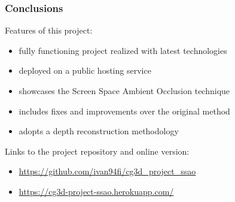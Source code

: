 \documentclass{beamer}
\begin{document}
\begin{frame}
\frametitle{Conclusions}
Features of this project:
\begin{itemize}
    \item fully functioning project realized with latest technologies
    \item deployed on a public hosting service
    \item showcases the Screen Space Ambient Occlusion technique
    \item includes fixes and improvements over the original method
    \item adopts a depth reconstruction methodology
\end{itemize}

Links to the project repository and online version:
\begin{itemize}
    \item \url{https://github.com/ivan94fi/cg3d_project_ssao}
    \item \url{https://cg3d-project-ssao.herokuapp.com/}
\end{itemize}

\end{frame}

\end{document}
